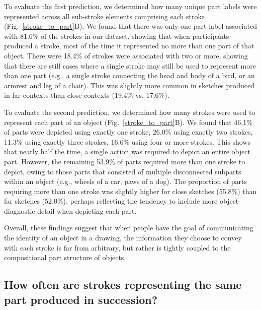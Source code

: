 \documentclass[10pt,letterpaper]{article}
\newcommand{\jefan}[1]{{\color{blue}{[jefan: #1]}}}
\begin{document}
To evaluate the first prediction, we determined how many unique part labels were represented across all sub-stroke elements comprising each stroke (Fig.~\ref{stroke_to_part}B). 
We found that there was only one part label associated with 81.6\% of the strokes in our dataset, showing that when participants produced a stroke, most of the time it represented no more than one part of that object. 
There were 18.4\% of strokes were associated with two or more, showing that there are still cases where a single stroke may still be used to represent more than one part (e.g., a single stroke connecting the head and body of a bird, or an armrest and leg of a chair). 
This was slightly more common in sketches produced in far contexts than close contexts (19.4\% vs. 17.6\%). \jefan{This needs additional analysis, i.e., bootstrapping, to evaluate statistical reliability between conditions.}

To evaluate the second prediction, we determined how many strokes were used to represent each part of an object (Fig.~\ref{stroke_to_part}B). 
We found that 46.1\% of parts were depicted using exactly one stroke, 26.0\% using exactly two strokes, 11.3\% using exactly three strokes, 16.6\% using four or more strokes. 
This shows that nearly half the time, a single action was required to depict an entire object part. 
However, the remaining 53.9\% of parts required more than one stroke to depict, owing to those parts that consisted of multiple disconnected subparts within an object (e.g., wheels of a car, paws of a dog).
\jefan{This should be verified in some way by subsetting on those feature columns that actually are likely to contain multiple instances per object.}
The proportion of parts requiring more than one stroke was slightly higher for close sketches (55.8\%) than far sketches (52.0\%), perhaps reflecting the tendency to include more object-diagnostic detail when depicting each part. 
\jefan{This needs additional analysis, i.e., bootstrapping, to evaluate statistical reliability between conditions.}

Overall, these findings suggest that when people have the goal of communicating the identity of an object in a drawing, the information they choose to convey with each stroke is far from arbitrary, but rather is tightly coupled to the compositional part structure of objects. 

\subsection{How often are strokes representing the same part produced in succession?}
\end{document}
